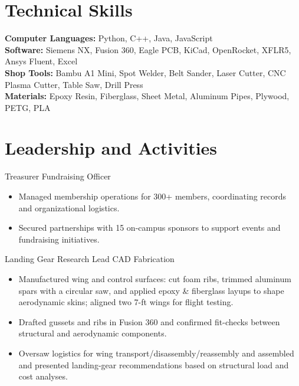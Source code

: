 \section{Technical Skills}
\textbf{Computer Languages:} Python, C++, Java, JavaScript\\
\textbf{Software:} Siemens NX, Fusion 360, Eagle PCB, KiCad, OpenRocket, XFLR5, Ansys Fluent, Excel\\
\textbf{Shop Tools:} Bambu A1 Mini, Spot Welder, Belt Sander, Laser Cutter, CNC Plasma Cutter, Table Saw, Drill Press\\
\textbf{Materials:} Epoxy Resin, Fiberglass, Sheet Metal, Aluminum Pipes, Plywood, PETG, PLA

\section{Leadership and Activities}

Treasurer \textbar{} Fundraising Officer
\begin{itemize}
  \item Managed membership operations for 300+ members, coordinating records and organizational logistics.
  \item Secured partnerships with 15 on-campus sponsors to support events and fundraising initiatives.
\end{itemize}
\entrygap

Landing Gear Research Lead \textbar{} CAD \textbar{} Fabrication
\begin{itemize}
  \item Manufactured wing and control surfaces: cut foam ribs, trimmed aluminum spars with a circular saw, and applied epoxy \& fiberglass layups to shape aerodynamic skins; aligned two 7-ft wings for flight testing.
  \item Drafted gussets and ribs in Fusion 360 and confirmed fit-checks between structural and aerodynamic components.
  \item Oversaw logistics for wing transport/disassembly/reassembly and assembled and presented landing-gear recommendations based on structural load and cost analyses.
\end{itemize}


